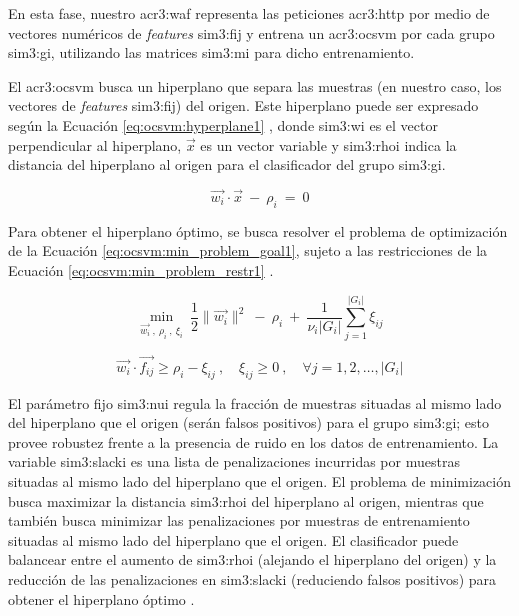 En esta fase, nuestro \gls{acr3:waf} representa las peticiones \gls{acr3:http}
por medio de vectores numéricos de \textit{features} \gls{sim3:fij} y entrena
un \gls{acr3:ocsvm} por cada grupo \gls{sim3:gi}, utilizando las matrices
\gls{sim3:mi} para dicho entrenamiento.


El \gls{acr3:ocsvm} busca un hiperplano que separa las muestras (en
nuestro caso, los vectores de \textit{features} \gls{sim3:fij}) del
origen. Este hiperplano puede ser expresado según la Ecuación
\ref{eq:ocsvm:hyperplane1}
\cite{parhizkar2015oc}, %
donde \gls{sim3:wi} es el vector perpendicular al hiperplano, $\vec{x}$
es un vector variable y \gls{sim3:rhoi} indica la distancia del hiperplano
al origen para el clasificador del grupo \gls{sim3:gi}.

\begin{equation}
    \label{eq:ocsvm:hyperplane1}
    \vec{w_{i}} \cdot \vec{x}
    \ - \
    \rho_{i}
    \ = \
    0
\end{equation}

Para obtener el hiperplano óptimo, se busca resolver el problema de
optimización de la Ecuación \ref{eq:ocsvm:min_problem_goal1}, sujeto a
las restricciones de la Ecuación \ref{eq:ocsvm:min_problem_restr1}
\cite{parhizkar2015oc}. %

\begin{equation}
    \label{eq:ocsvm:min_problem_goal1}
    \min_{
        \vec{w_{i}}
        \ , \
        \rho_{i}
        \ , \
        \xi_{i}
    }
    \
    \frac{1}{2} \lVert {\vec{w_{i}}} \rVert^2
    \ - \
    \rho_{i}
    \ + \
    \frac{1}{\nu_{i} \lvert G_{i} \rvert} \sum_{j=1}^{\lvert G_{i} \rvert} \xi_{ij}
\end{equation}

\begin{equation}
    \label{eq:ocsvm:min_problem_restr1}
    \vec{w_{i}} \cdot \vec{f_{ij}} \geqslant \rho_{i} - \xi_{ij}
    \ , \quad
    \xi_{ij} \geqslant 0
    \ , \quad
    \forall j = 1,2, \dots, \lvert G_{i} \rvert
\end{equation}

El parámetro fijo \gls{sim3:nui} regula la fracción de muestras situadas
al mismo lado del hiperplano que el origen (serán falsos positivos) para
el grupo \gls{sim3:gi}; esto provee robustez frente a la presencia de
ruido en los datos de entrenamiento. La variable \gls{sim3:slacki} es una
lista de penalizaciones incurridas por muestras situadas al mismo lado
del hiperplano que el origen.
El problema de minimización busca maximizar la distancia \gls{sim3:rhoi}
del hiperplano al origen, mientras que también busca minimizar las
penalizaciones por muestras de entrenamiento situadas al mismo lado
del hiperplano que el origen.
El clasificador puede balancear entre el aumento de \gls{sim3:rhoi}
(alejando el hiperplano del origen) y la reducción de las penalizaciones
en \gls{sim3:slacki} (reduciendo falsos positivos) para obtener el
hiperplano óptimo
\cite{parhizkar2015oc}. %



